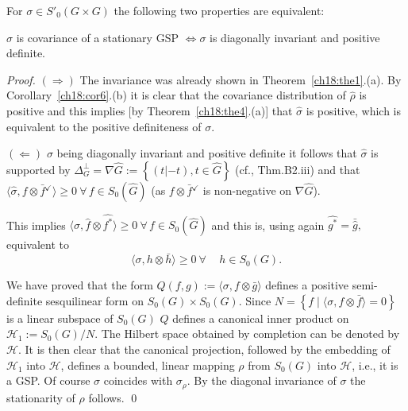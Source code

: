 \documentclass[graybox]{svmult}
\newcommand\checkm{{^\checkmark}}  %
\begin{document}
\setcounter{theorem}{6}

\begin{theorem}
\label{ch18:thm7}
\noindent For $\sigma \in
{}S'_{0}(G\times G)$ the following two properties are equivalent:

\noindent $\sigma $ is covariance of a stationary GSP $\Longleftrightarrow \sigma$ is diagonally invariant
and positive definite.
\end{theorem}

\begin{proof}
$(\Rightarrow )$ The invariance was already shown in Theorem~\ref{ch18:the1}.(a).  By Corollary~\ref{ch18:cor6}.(b) it is clear that the covariance distribution of
$\hat{\rho }$ is positive and this implies [by Theorem~\ref{ch18:the4}.(a)] that
$\hat{\sigma }$ is positive, which is equivalent to the positive
definiteness of $\sigma$.

\noindent $(\Leftarrow )$ $\sigma$ being
diagonally invariant and positive definite it follows
that $\hat{\sigma}$  is supported by
$\varDelta _{G}^\perp = \nabla \hat{G} :=
\left\{ (t| -t) , t\in {}\hat{G} \right \}$  %
(cf.\cite{fe80}, %
Thm.B2.iii) and that
$\langle\hat{\sigma },f\otimes \bar{f} \checkm \rangle \ge 0
\ \forall \, f \in S_{0}(\hat{G})$
(as $f\otimes \bar{f} \checkm $ is
non-negative on $\nabla \hat{G}$).

\noindent This implies
$\langle\sigma,\hat{f}\otimes \widehat{f^*}   \rangle
 \ge 0 \ \forall \, f \in S_{0}(\hat{G})$
 and this is, using again $ \widehat{g^*} = \bar{\widehat{g}},$
equivalent to
$$
\langle\sigma ,  h \otimes \bar{h}\rangle \ge  0
\ \forall \, \quad  h \in
S_{0}(G).
$$


We have proved that the form $Q(f,g) := \langle\sigma
,f\otimes \bar{g}\rangle $ defines a positive semi-definite sesquilinear
form on $S_{0}(G)\times S_{0}(G)$.  Since $N = \left\{ f \mid
\langle\sigma
,f\otimes \bar{f}\rangle = 0 \right\} $ is a linear subspace of
$S_{0}(G)$ $Q$ defines a canonical inner product on $\mathcal{H}_{1}:=
S_{0}(G)/N$.  The Hilbert space obtained by completion can be denoted by
$\mathcal{H}$.  It is then clear that the canonical projection, followed by
the embedding of $\mathcal{H}_{1}$ into $\mathcal{H}$, defines a bounded,
linear mapping $\rho $ from $S_{0}(G)$ into $\mathcal{H}$, i.e., it is a
GSP.  Of course $\sigma $ coincides with $\sigma _{\rho }$.  By the
diagonal invariance of $\sigma $ the stationarity of $\rho $ follows.
\qed
\end{proof}
\end{document}
